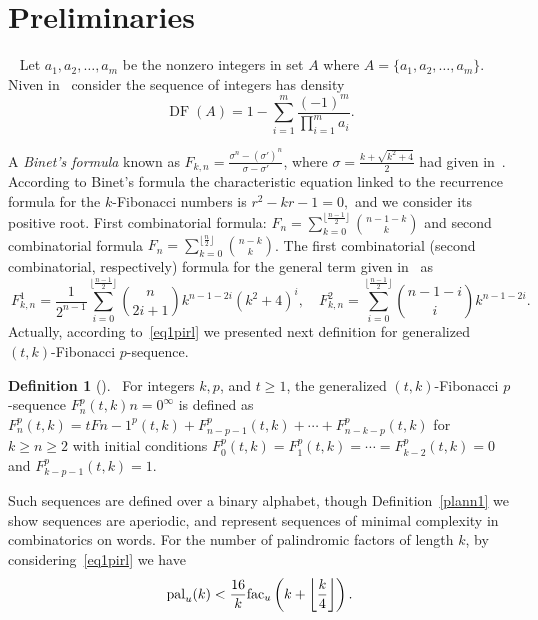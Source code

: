 \documentclass[11pt, a4paper]{article}
\DeclarePairedDelimiter\floor{\lfloor}{\rfloor}
\theoremstyle{definition}
\newtheorem{definition}{Definition}[section]
\begin{document}
\section{Preliminaries}~\label{sec2}
Let $a_1, a_2,\dots, a_m$ be the nonzero integers in set $A$ where $A=\{a_1, a_2,\dots, a_m\}$. Niven in~\cite{Niven1951} consider  the sequence of integers has density 
 \[
 \operatorname{DF}(A)=1-\sum_{i=1}^{m}\frac{(-1)^m}{\prod_{i=1}^{m} a_i}.
 \]
 
 A \emph{Binet's formula} known as $F_{k,n} = \frac{\sigma^n - (\sigma')^n}{\sigma - \sigma'}$, where $\sigma = \frac{k + \sqrt{k^2 + 4}}{2}$ had given in~\cite{Falcon2007Plaza,Falcon2007PlazaSeco}. According to Binet's formula the characteristic equation linked to the recurrence formula for the $k$-Fibonacci numbers is $r^2 - kr - 1 = 0,$
and we consider its positive root. First combinatorial formula: $F_n = \sum_{k=0}^{\lfloor \frac{n-1}{2} \rfloor} \binom{n-1-k}{k}$ and second combinatorial formula $F_n = \sum_{k=0}^{\lfloor \frac{n}{2} \rfloor} \binom{n-k}{k}$. The first combinatorial (second combinatorial, respectively) formula for the general term given in~\cite{Falcon2007PlazaThird}
 as 
 \begin{equation}~\label{eq1pirl}
F^{1}_{k,n} = \frac{1}{2^{n-1}} \sum_{i=0}^{\lfloor \frac{n-1}{2} \rfloor} \binom{n}{2i+1} k^{n-1-2i} (k^2+4)^i, \quad F^{2}_{k,n} = \sum_{i=0}^{\lfloor \frac{n-1}{2} \rfloor} \binom{n-1-i}{i} k^{n-1-2i}.
 \end{equation}
Actually, according to~\eqref{eq1pirl} we presented next definition for generalized $(t,k)$-Fibonacci $p$-sequence.  
\begin{definition}[\cite{Mehraban2006Gulliver}]~\label{defn1pil}
For integers $k, p$, and $t \geq 1$, the generalized $(t,k)$-Fibonacci $p$-sequence ${F_n^p(t,k)}{n=0}^\infty$ is defined as
$F_n^p(t,k) = t F{n-1}^p(t,k) + F_{n-p-1}^p(t,k) + \cdots + F_{n-k-p}^p(t,k)$ for $k \geq n \geq 2$ with initial conditions $F_0^p(t,k) = F_1^p(t,k) = \cdots = F_{k-2}^p(t,k) = 0$ and $F_{k-p-1}^p(t,k) = 1$.
\end{definition}
Such sequences are defined over a binary alphabet, though Definition~\ref{plann1} we show sequences are aperiodic, and represent sequences of minimal complexity in combinatorics on words. For the number of palindromic factors of length $k$, by considering~\eqref{eq1pirl} we have
\[
\mathrm{pal}_u(k)<\frac{16}{k}\mathrm{fac}_u\left(k+\floor*{\frac{k}{4}} \right).
\]
\end{document}
